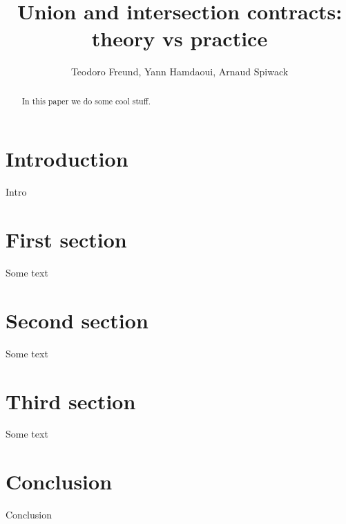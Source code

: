\documentclass{article}
\title{Union and intersection contracts: theory vs practice}
\author{Teodoro Freund, Yann Hamdaoui, Arnaud Spiwack}
\begin{document}
\maketitle

\begin{abstract}
 In this paper we do some cool stuff.
\end{abstract}

\section*{Introduction}
Intro

\section{First section}
Some text

\section{Second section}
Some text

\section{Third section}
Some text

\section*{Conclusion}
Conclusion
\end{document}
